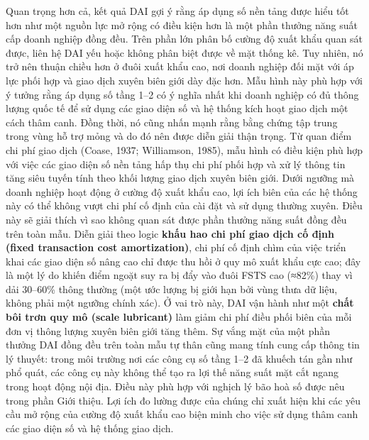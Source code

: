 \documentclass[12pt,a4paper]{article}
\begin{document}
Quan trọng hơn cả, kết quả DAI gợi ý rằng áp dụng số nền tảng được hiểu
tốt hơn như một nguồn lực mở rộng có điều kiện hơn là một phần thưởng
năng suất cấp doanh nghiệp đồng đều. Trên phần lớn phân bố cường độ xuất
khẩu quan sát được, liên hệ DAI yếu hoặc không phân biệt được về mặt
thống kê. Tuy nhiên, nó trở nên thuận chiều hơn ở đuôi xuất khẩu cao,
nơi doanh nghiệp đối mặt với áp lực phối hợp và giao dịch xuyên biên
giới dày đặc hơn. Mẫu hình này phù hợp với ý tưởng rằng áp dụng số tầng
1--2 có ý nghĩa nhất khi doanh nghiệp có đủ thông lượng quốc tế để sử
dụng các giao diện số và hệ thống kích hoạt giao dịch một cách thâm
canh. Đồng thời, nó cũng nhấn mạnh rằng bằng chứng tập trung trong vùng
hỗ trợ mỏng và do đó nên được diễn giải thận trọng. Từ quan điểm chi phí
giao dịch (Coase, 1937; Williamson, 1985), mẫu hình có điều kiện phù hợp
với việc các giao diện số nền tảng hấp thụ chi phí phối hợp và xử lý
thông tin tăng siêu tuyến tính theo khối lượng giao dịch xuyên biên
giới. Dưới ngưỡng mà doanh nghiệp hoạt động ở cường độ xuất khẩu cao,
lợi ích biên của các hệ thống này có thể không vượt chi phí cố định của
cài đặt và sử dụng thường xuyên. Điều này sẽ giải thích vì sao không
quan sát được phần thưởng năng suất đồng đều trên toàn mẫu. Diễn giải
theo logic \textbf{khấu hao chi phí giao dịch cố định (fixed transaction
cost amortization)}, chi phí cố định chìm của việc triển khai các giao
diện số nâng cao chỉ được thu hồi ở quy mô xuất khẩu cực cao; đây là một
lý do khiến điểm ngoặt suy ra bị đẩy vào đuôi FSTS cao (≈82\%) thay vì
dải 30--60\% thông thường (một ước lượng bị giới hạn bởi vùng thưa dữ
liệu, không phải một ngưỡng chính xác). Ở vai trò này, DAI vận hành như
một \textbf{chất bôi trơn quy mô (scale lubricant)} làm giảm chi phí
điều phối biên của mỗi đơn vị thông lượng xuyên biên giới tăng thêm. Sự
vắng mặt của một phần thưởng DAI đồng đều trên toàn mẫu tự thân cũng
mang tính cung cấp thông tin lý thuyết: trong môi trường nơi các công cụ
số tầng 1--2 đã khuếch tán gần như phổ quát, các công cụ này không thể
tạo ra lợi thế năng suất mặt cắt ngang trong hoạt động nội địa. Điều này
phù hợp với nghịch lý bão hoà số được nêu trong phần Giới thiệu. Lợi ích
đo lường được của chúng chỉ xuất hiện khi các yêu cầu mở rộng của cường
độ xuất khẩu cao biện minh cho việc sử dụng thâm canh các giao diện số
và hệ thống giao dịch.
\end{document}
